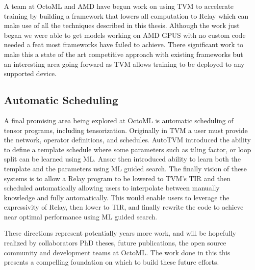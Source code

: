 A team at OctoML and AMD have begun work on using TVM
    to accelerate training by building a framework
    that lowers all computation to Relay which
    can make use of all the techniques described
    in this thesis.
Although the work just began we were able to
    get models working on AMD GPUS with no custom
    code needed a feat most frameworks have
    failed to achieve.
There significant work to make this a state
    of the art competitive approach with existing
    frameworks but an interesting area going forward
    as TVM allows training to be deployed to any
    supported device.

\subsection{Automatic Scheduling}

A final promising area being explored at OctoML is
    automatic scheduling of tensor programs, including
    tensorization.
Originally in TVM a user must provide the network,
    operator definitions, and schedules.
AutoTVM introduced the ability to define a template
    schedule where some parameters such as tiling
    factor, or loop split can be learned using ML.
Ansor then introduced ability to learn both the
    template and the parameters using ML guided
    search.
The finally vision of these systems is to allow
    a Relay program to be lowered to TVM's TIR
    and then scheduled automatically allowing
    users to interpolate between manually
    knowledge and fully automatically.
This would enable users to leverage the
    expressivity of Relay, then lower to TIR,
    and finally rewrite the code to achieve
    near optimal performance using ML guided
    search.

These directions represent potentially years more work, and will be hopefully
    realized by collaborators PhD theses, future publications, the open source
    community and development teams at OctoML.
The work done in this this presents a compelling foundation on which to build
    these future efforts.
